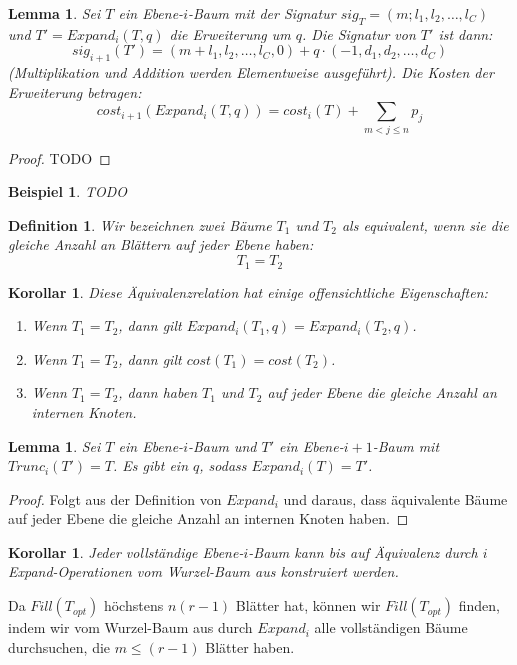 \documentclass[a4paper,10pt,ngerman]{scrartcl}
\newtheorem{definition}[satz]{Definition}
\newtheorem{lemma}[satz]{Lemma}
\newtheorem{beispiel}[satz]{Beispiel}
\newtheorem{korollar}[satz]{Korollar}
\begin{document}
    \begin{lemma}
        Sei $T$ ein Ebene-$i$-Baum mit der Signatur $sig_T = (m;l_1,l_2,\dots,l_C)$ und $T' = Expand_i(T,q)$ die Erweiterung um $q$. Die Signatur von $T'$ ist dann: \[sig_{i+1}(T') = (m + l_1, l_2, \dots, l_C, 0) + q \cdot (-1, d_1, d_2, \dots, d_C)\]
        (Multiplikation und Addition werden Elementweise ausgeführt). Die Kosten der Erweiterung betragen:
        \[cost_{i+1}(Expand_i(T,q)) = cost_i(T) + \sum_{m < j \le n}p_j\]
    \end{lemma}
    \begin{proof}
        TODO
    \end{proof}
    \begin{beispiel}
        TODO
    \end{beispiel}

    \begin{definition}
        Wir bezeichnen zwei Bäume $T_1$ und $T_2$ als equivalent, wenn sie die gleiche Anzahl an Blättern auf jeder Ebene haben:
        \[T_1 = T_2\]
    \end{definition}
    \begin{korollar}
        Diese Äquivalenzrelation hat einige offensichtliche Eigenschaften:
        \begin{enumerate}
            \item Wenn $T_1 = T_2$, dann gilt $Expand_i(T_1, q) = Expand_i(T_2, q)$.
            \item Wenn $T_1 = T_2$, dann gilt $cost(T_1) = cost(T_2)$.
            \item Wenn $T_1 = T_2$, dann haben $T_1$ und $T_2$ auf jeder Ebene die gleiche Anzahl an internen Knoten.
        \end{enumerate}
    \end{korollar}
    \begin{lemma}
        Sei $T$ ein Ebene-$i$-Baum und $T'$ ein Ebene-$i+1$-Baum mit $Trunc_i(T') = T$.
        Es gibt ein $q$, sodass $Expand_i(T) = T'$.
    \end{lemma}
    \begin{proof}
        Folgt aus der Definition von $Expand_i$ und daraus, dass äquivalente Bäume auf jeder Ebene die gleiche Anzahl an internen Knoten haben.
    \end{proof}
    \begin{korollar}
        \label{lem:funktioniert}
        Jeder vollständige Ebene-$i$-Baum kann bis auf Äquivalenz durch $i$ Expand-Operationen vom Wurzel-Baum aus konstruiert werden.
    \end{korollar}
    Da $Fill(T_{opt})$ höchstens $n (r -1)$ Blätter hat, können wir $Fill(T_{opt})$ finden, indem wir vom Wurzel-Baum aus
    durch $Expand_i$ alle vollständigen Bäume durchsuchen, die $m \le (r - 1)$ Blätter haben.
\end{document}
